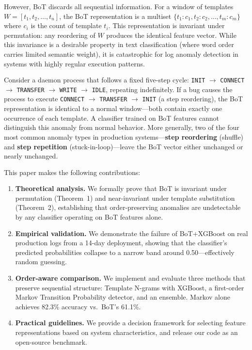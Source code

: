 \documentclass[11pt]{article}
\begin{document}
However, BoT discards all sequential information.
For a window of templates $W = [t_1, t_2, \dots, t_n]$, the BoT representation is a multiset $\{t_1: c_1, t_2: c_2, \dots, t_m: c_m\}$ where $c_i$ is the count of template $t_i$.
This representation is invariant under permutation: any reordering of $W$ produces the identical feature vector.
While this invariance is a desirable property in text classification (where word order carries limited semantic weight), it is catastrophic for log anomaly detection in systems with highly regular execution patterns.

Consider a daemon process that follows a fixed five-step cycle: \texttt{INIT} $\rightarrow$ \texttt{CONNECT} $\rightarrow$ \texttt{TRANSFER} $\rightarrow$ \texttt{WRITE} $\rightarrow$ \texttt{IDLE}, repeating indefinitely.
If a bug causes the process to execute \texttt{CONNECT} $\rightarrow$ \texttt{TRANSFER} $\rightarrow$ \texttt{INIT} (a step reordering), the BoT representation is identical to a normal window---both contain exactly one occurrence of each template.
A classifier trained on BoT features cannot distinguish this anomaly from normal behavior.
More generally, two of the four most common anomaly types in production systems---\textbf{step reordering} (shuffle) and \textbf{step repetition} (stuck-in-loop)---leave the BoT vector either unchanged or nearly unchanged.

This paper makes the following contributions:

\begin{enumerate}[leftmargin=*,itemsep=2pt]
    \item \textbf{Theoretical analysis.} We formally prove that BoT is invariant under permutation (Theorem~1) and near-invariant under template substitution (Theorem~2), establishing that order-preserving anomalies are undetectable by any classifier operating on BoT features alone.
    
    \item \textbf{Empirical validation.} We demonstrate the failure of BoT+XGBoost on real production logs from a 14-day deployment, showing that the classifier's predicted probabilities collapse to a narrow band around 0.50---effectively random guessing.
    
    \item \textbf{Order-aware comparison.} We implement and evaluate three methods that preserve sequential structure: Template N-grams with XGBoost, a first-order Markov Transition Probability detector, and an ensemble. Markov alone achieves 82.3\% accuracy vs.\ BoT's 61.1\%.
    
    \item \textbf{Practical guidelines.} We provide a decision framework for selecting feature representations based on system characteristics, and release our code as an open-source benchmark.
\end{enumerate}
\end{document}
